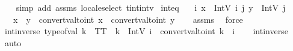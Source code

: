 \begin{isabellebody}
%
\isadelimproof
\ \ %
\endisadelimproof
%
\isatagproof
{}\isamarkupfalse%
\ {\isacharparenleft}{\kern0pt}simp\ add{\isacharcolon}{\kern0pt}\ assms\ locale{\isacharunderscore}{\kern0pt}select\ tint{\isacharunderscore}{\kern0pt}intv{\isacharparenright}{\kern0pt}%
\endisatagproof
{\isafoldproof}%
%
\isadelimproof
\isanewline
%
\endisadelimproof
\isanewline
{}\isamarkupfalse%
\ inteq{\isacharcolon}{\kern0pt}\isanewline
\ \ \ {\isachardoublequoteopen}{\isasymexists}i{\isachardot}{\kern0pt}\ x\ {\isacharequal}{\kern0pt}\ IntV\ i{\isachardoublequoteclose}\ {\isachardoublequoteopen}{\isasymexists}j{\isachardot}{\kern0pt}\ y\ {\isacharequal}{\kern0pt}\ IntV\ j{\isachardoublequoteclose}\isanewline
\ \ \ {\isachardoublequoteopen}{\isacharparenleft}{\kern0pt}x\ {\isacharequal}{\kern0pt}\ y{\isacharparenright}{\kern0pt}\ {\isacharequal}{\kern0pt}\ {\isacharparenleft}{\kern0pt}convert{\isacharunderscore}{\kern0pt}val{\isacharunderscore}{\kern0pt}to{\isacharunderscore}{\kern0pt}int\ x\ {\isacharequal}{\kern0pt}\ convert{\isacharunderscore}{\kern0pt}val{\isacharunderscore}{\kern0pt}to{\isacharunderscore}{\kern0pt}int\ y{\isacharparenright}{\kern0pt}{\isachardoublequoteclose}\isanewline
%
\isadelimproof
\ \ %
\endisadelimproof
%
\isatagproof
{}\isamarkupfalse%
\ assms{\isacharparenleft}{\kern0pt}{}{\isacharcomma}{\kern0pt}{}{\isacharparenright}{\kern0pt}\ \isamarkupfalse%
\ force%
\endisatagproof
{\isafoldproof}%
%
\isadelimproof
\isanewline
%
\endisadelimproof
\isanewline
{}\isamarkupfalse%
\ int{\isacharunderscore}{\kern0pt}inverse{\isacharunderscore}{\kern0pt}{}{\isacharcolon}{\kern0pt}\ {\isachardoublequoteopen}type{\isacharunderscore}{\kern0pt}of{\isacharunderscore}{\kern0pt}val\ k\ {\isacharequal}{\kern0pt}\ TT\ {\isasymLongrightarrow}\ {\isacharparenleft}{\kern0pt}k\ {\isacharequal}{\kern0pt}\ IntV\ i{\isacharparenright}{\kern0pt}\ {\isacharequal}{\kern0pt}\ {\isacharparenleft}{\kern0pt}convert{\isacharunderscore}{\kern0pt}val{\isacharunderscore}{\kern0pt}to{\isacharunderscore}{\kern0pt}int\ k\ {\isacharequal}{\kern0pt}\ i{\isacharparenright}{\kern0pt}{\isachardoublequoteclose}\isanewline
%
\isadelimproof
\ \ %
\endisadelimproof
%
\isatagproof
{}\isamarkupfalse%
\ int{\isacharunderscore}{\kern0pt}inverse{\isacharunderscore}{\kern0pt}{}\ \isamarkupfalse%
\ auto%
\endisatagproof
{\isafoldproof}%
%
\isadelimproof
\isanewline
%
\endisadelimproof
\isanewline

\end{isabellebody}
